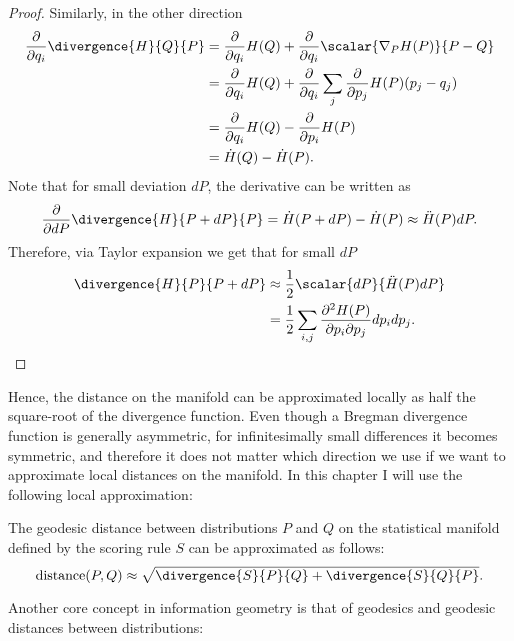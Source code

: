 \begin{statement}
\begin{proof}
		Similarly, in the other direction
			\begin{align}
					\frac{\partial}{\partial q_i} \divergence{H}{Q}{P} &=  \frac{\partial}{\partial q_i} H(Q) +     \frac{\partial}{\partial q_i}\scalar{\nabla_{P} H(P)}{P - Q}\\
						&=  \frac{\partial}{\partial q_i} H(Q) + \frac{\partial}{\partial q_i}\sum_{j} \frac{\partial}{\partial p_j} H(P) (p_j - q_j)\\
						&=  \frac{\partial}{\partial q_i} H(Q)  - \frac{\partial}{\partial p_i} H(P)\\
						&= \dot{H}(Q) - \dot{H}(P).
			\end{align}
			Note that for small deviation $dP$, the derivative can be written as
			\begin{align}
				\frac{\partial}{\partial dP} \divergence{H}{P+dP}{P} = \dot{H}(P+dP) - \dot{H}(P) \approx  \ddot{H}(P) dP.
			\end{align}
			Therefore, via Taylor expansion we get that for small $dP$
			\begin{align}
				\divergence{H}{P}{P+dP} &\approx \frac{1}{2} \scalar{dP}{\ddot{H}(P)dP}\\
					&= \frac{1}{2} \sum_{i,j} \frac{\partial^2 H(P)}{\partial p_i\partial p_j} dp_{i} dp_j.
			\end{align}
	\end{proof}
\end{statement}

Hence, the distance on the manifold can be approximated locally as half the square-root of the divergence function. Even though a Bregman divergence function is generally asymmetric, for infinitesimally small differences it becomes symmetric, and therefore it does not matter which direction we use if we want to approximate local distances on the manifold. In this chapter I will use the following local approximation:

\begin{corollary}
	The geodesic distance between distributions $P$ and $Q$ on the statistical manifold defined by the scoring rule $S$ can be approximated as follows:
	\begin{equation}
		\mbox{distance}(P,Q) \approx \sqrt{\divergence{S}{P}{Q} + \divergence{S}{Q}{P}}. \label{eqn:local_approximation}
	\end{equation}
\end{corollary}

Another core concept in information geometry is that of geodesics and geodesic distances between distributions:

